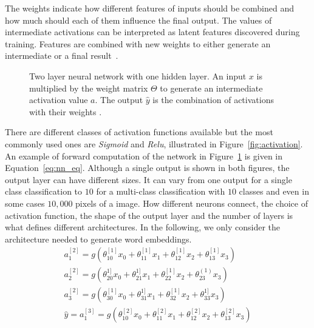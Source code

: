 %
The weights indicate how different features of inputs should be combined and how much should each of them influence the final output. The values of intermediate activations can be interpreted as latent features discovered during training. Features are combined with new weights to either generate an intermediate or a final result~. \\
\begin{figure}
\begin{minipage}{\textwidth}
\centering 
\resizebox{0.65\textwidth}{0.4\textwidth}{      

}
\caption{Two layer neural network with one hidden layer. An input $x$ is multiplied by the weight matrix $\Theta$ to generate an intermediate activation value $a$. The output $\hat { y } $ is the combination of activations with their weights \protect \footnotemark .}

\label{fig:nn}
  \end{minipage}

\end{figure}
\noindent
There are different classes of activation functions available but the most commonly used ones are \emph{Sigmoid} and \emph{Relu}, illustrated in Figure~\ref{fig:activation}. An example of forward computation of the network in Figure~\ref{fig:nn} is given in Equation~\ref{eq:nn_eq}. Although a single output is shown in both figures, the output layer can have different sizes. It can vary from one output for a single class classification to $10$ for a multi-class classification with $10$ classes and even in some cases $10,000$ pixels of a image. How different neurons connect, the choice of activation function, the shape of the output layer and the number of layers is what defines different architectures. In the following, we only consider the architecture needed to generate word embeddings. 
\begin{equation}
\begin{split}
a_{ 1 }^{ [2] }=g(\theta _{ 10 }^{ [1] }x_{ 0 }+\theta _{ 11 }^{ [1]}x_{ 1 }+\theta _{ 12 }^{ [1] }x_{ 2 }+\theta _{ 13 }^{ [1] }x_{ 3 })\\ 
a_{ 2 }^{ [2] }=g(\theta _{ 20 }^{ 1] }x_{ 0 }+\theta _{ 21 }^{ 1] }x_{ 1 }+\theta _{ 22 }^{ [1] }x_{ 2 }+\theta _{ 23 }^{ (1) }x_{ 3 })\\
 a_{ 3 }^{ [2] }=g(\theta _{ 30 }^{ [1] }x_{ 0 }+\theta _{ 31 }^{ 1] }x_{ 1 }+\theta _{ 32 }^{ [1] }x_{ 2 }+\theta _{ 33 }^{ 1] }x_{ 3 })\\
  \hat { y } =a_{ 1 }^{ [3] }=g(\theta _{ 10 }^{ [2] }x_{ 0 }+\theta _{ 11 }^{ [2] }x_{ 1 }+\theta _{ 12 }^{ [2] }x_{ 2 }+\theta _{ 13 }^{ [2] }x_{ 3 })
\end{split}
\label{eq:nn_eq}
\end{equation}
